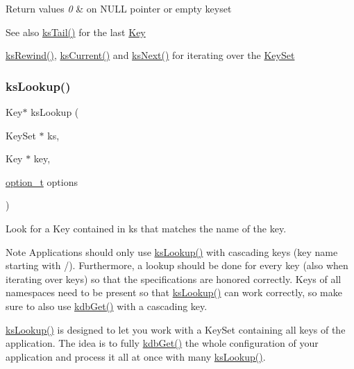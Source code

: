 \begin{DoxyRetVals}{Return values}
{\em 0} & on N\+U\+LL pointer or empty keyset \\
\hline
\end{DoxyRetVals}
\begin{DoxySeeAlso}{See also}
\mbox{\hyperlink{group__keyset_gadca442c4ab43cf532b15091d7711559e}{ks\+Tail()}} for the last \mbox{\hyperlink{group__key}{Key}} 

\mbox{\hyperlink{group__keyset_gabe793ff51f1728e3429c84a8a9086b70}{ks\+Rewind()}}, \mbox{\hyperlink{group__keyset_ga4287b9416912c5f2ab9c195cb74fb094}{ks\+Current()}} and \mbox{\hyperlink{group__keyset_ga317321c9065b5a4b3e33fe1c399bcec9}{ks\+Next()}} for iterating over the \mbox{\hyperlink{group__keyset}{Key\+Set}} 
\end{DoxySeeAlso}
\mbox{\label{group__keyset_gaa34fc43a081e6b01e4120daa6c112004}} 
\subsubsection{\texorpdfstring{ksLookup()}{ksLookup()}}
{\footnotesize\ttfamily Key$\ast$ ks\+Lookup (\begin{DoxyParamCaption}\item[{Key\+Set $\ast$}]{ks,  }\item[{Key $\ast$}]{key,  }\item[{\mbox{\hyperlink{group__keyset_ga98a3d6a4016c9dad9cbd1a99a9c2a45a}{option\+\_\+t}}}]{options }\end{DoxyParamCaption})}



Look for a Key contained in {\ttfamily ks} that matches the name of the {\ttfamily key}. 

\begin{DoxyNote}{Note}
Applications should only use \mbox{\hyperlink{group__keyset_gaa34fc43a081e6b01e4120daa6c112004}{ks\+Lookup()}} with cascading keys (key name starting with {\ttfamily /}). Furthermore, a lookup should be done for every key (also when iterating over keys) so that the specifications are honored correctly. Keys of all namespaces need to be present so that \mbox{\hyperlink{group__keyset_gaa34fc43a081e6b01e4120daa6c112004}{ks\+Lookup()}} can work correctly, so make sure to also use \mbox{\hyperlink{group__kdb_ga28e385fd9cb7ccfe0b2f1ed2f62453a1}{kdb\+Get()}} with a cascading key.
\end{DoxyNote}
{\ttfamily \mbox{\hyperlink{group__keyset_gaa34fc43a081e6b01e4120daa6c112004}{ks\+Lookup()}}} is designed to let you work with a Key\+Set containing all keys of the application. The idea is to fully \mbox{\hyperlink{group__kdb_ga28e385fd9cb7ccfe0b2f1ed2f62453a1}{kdb\+Get()}} the whole configuration of your application and process it all at once with many {\ttfamily \mbox{\hyperlink{group__keyset_gaa34fc43a081e6b01e4120daa6c112004}{ks\+Lookup()}}}.

